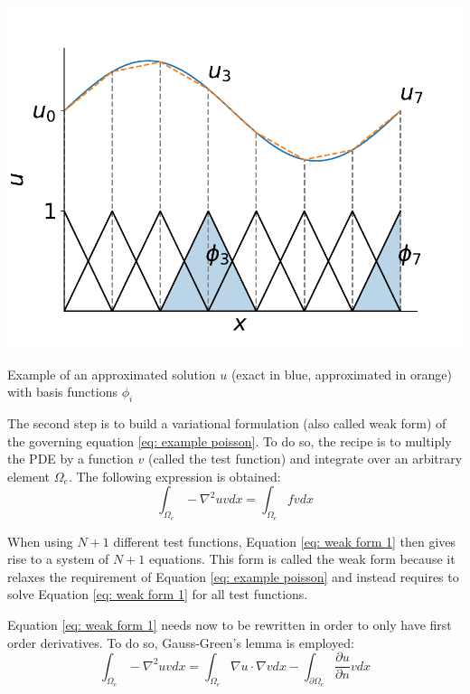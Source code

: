 \begin{marginfigure}
    \centering
    \includegraphics[width=\linewidth]{Figures/Chapter2/approximated_solution.pdf}
    \caption{Example of an approximated solution $u$ (exact in blue, approximated in orange) with basis functions $\phi_i$}
    \label{fig: example approximated solution}
\end{marginfigure}


The second step is to build a variational formulation (also called weak form) of the governing equation \ref{eq: example poisson}.
To do so, the recipe is to multiply the PDE by a function $v$ (called the test function) and integrate over an arbitrary element $\Omega_e$.
The following expression is obtained:
\begin{equation}
    \int_{\Omega_e} -\nabla^2 u v dx = \int_{\Omega_e} f v dx
    \label{eq: weak form 1}
\end{equation}

When using $N+1$ different test functions, Equation \ref{eq: weak form 1} then gives rise to a system of $N+1$ equations.
This form is called the weak form because it relaxes the requirement of Equation \ref{eq: example poisson} and instead requires to solve Equation \ref{eq: weak form 1} for all test functions.

Equation \ref{eq: weak form 1} needs now to be rewritten in order to only have first order derivatives.
To do so, Gauss-Green's lemma is employed:
\begin{equation}
    \int_{\Omega_e} -\nabla^2 u v dx = \int_{\Omega_e} \nabla u \cdot \nabla v dx - \int_{\partial \Omega_e} \frac{\partial u}{\partial n} v dx
    \label{eq: gauss-green}
\end{equation}

